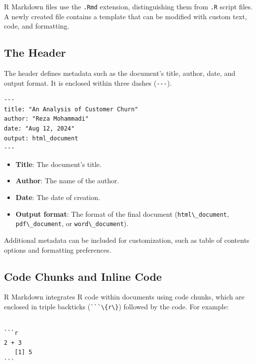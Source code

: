 \documentclass[
]{book}
\newcommand{\passthrough}[1]{#1}
\providecommand{\tightlist}{%
  \setlength{\itemsep}{0pt}\setlength{\parskip}{0pt}}
\theoremstyle{definition}
\theoremstyle{definition}
\theoremstyle{definition}
\theoremstyle{definition}
\theoremstyle{remark}
\begin{document}
R Markdown files use the \passthrough{\lstinline!.Rmd!} extension, distinguishing them from \passthrough{\lstinline!.R!} script files. A newly created file contains a template that can be modified with custom text, code, and formatting.

\subsection*{The Header}\label{the-header}

The header defines metadata such as the document's title, author, date, and output format. It is enclosed within three dashes (\passthrough{\lstinline!---!}).

\begin{lstlisting}
---
title: "An Analysis of Customer Churn"
author: "Reza Mohammadi"
date: "Aug 12, 2024"
output: html_document
---
\end{lstlisting}

\begin{itemize}
\tightlist
\item
  \textbf{Title}: The document's title.\\
\item
  \textbf{Author}: The name of the author.\\
\item
  \textbf{Date}: The date of creation.\\
\item
  \textbf{Output format}: The format of the final document (\passthrough{\lstinline!html\_document!}, \passthrough{\lstinline!pdf\_document!}, or \passthrough{\lstinline!word\_document!}).
\end{itemize}

Additional metadata can be included for customization, such as table of contents options and formatting preferences.

\subsection*{Code Chunks and Inline Code}\label{code-chunks-and-inline-code}

R Markdown integrates R code within documents using code chunks, which are enclosed in triple backticks (\passthrough{\lstinline!```\{r\}!}) followed by the code. For example:

\begin{lstlisting}

```r
2 + 3
   [1] 5
```
\end{lstlisting}
\end{document}
